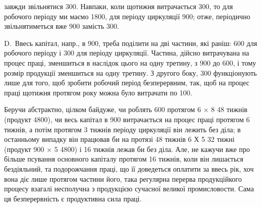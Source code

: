 \parcont{}  %
завжди звільнятися 300. Навпаки, коли щотижня витрачається
300, то для робочого періоду ми маємо 1800, для періоду
циркуляції 900; отже, періодично звільнятиметься вже 900
замість 300.

D.~Ввесь капітал, напр., в 900, треба поділити на дві частини,
які раніш: 600 для робочого періоду і 300 для періоду
циркуляції. Частина, дійсно витрачувана на процес праці, зменшиться в
наслідок цього на одну третину, з 900 до 600, і тому розмір продукції
зменшиться на одну третину. З другого боку, 300
функціонують лише для того, щоб зробити робочий період безперервним,
так, щоб на процес праці щотижня протягом року можна було витрачати
по 100.

Беручи абстрактно, цілком байдуже, чи роблять 600 протягом
6 × 8 \deq{} 48 тижнів (продукт \deq{} 4800), чи весь капітал в 900
витрачається на процес праці протягом 6 тижнів, а потім протягом
3 тижнів періоду циркуляції він лежить без діла; в останньому випадку
він працював би на протязі 48 тижнів 6 Х 5  \deq{} 32 тижні (продукт \deq{}
900 × 5 \deq{} 4800) і 16 тижнів лежав би без діла. Але, не кажучи
вже про більше псування основного капіталу протягом 16 тижнів, коли
він лишається бездіяльний, та подорожчання праці, що її доведеться оплатити
за ввесь рік, хоч вона діє лише протягом частини його, така регулярна
перерва продукційкого процесу взагалі несполучна з продукцією
сучасної великої промисловости. Сама ця безперервність є продуктивна
сила праці.

